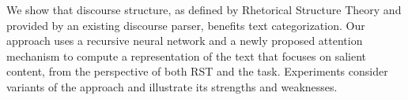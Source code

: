 We show that discourse structure, as defined by Rhetorical Structure Theory and provided by an existing discourse parser, benefits text categorization.  Our approach uses a recursive neural network and a newly proposed attention mechanism to compute a representation of the text that focuses on salient content, from the perspective of both RST and the task.  Experiments consider variants of the approach and illustrate its strengths and weaknesses.
